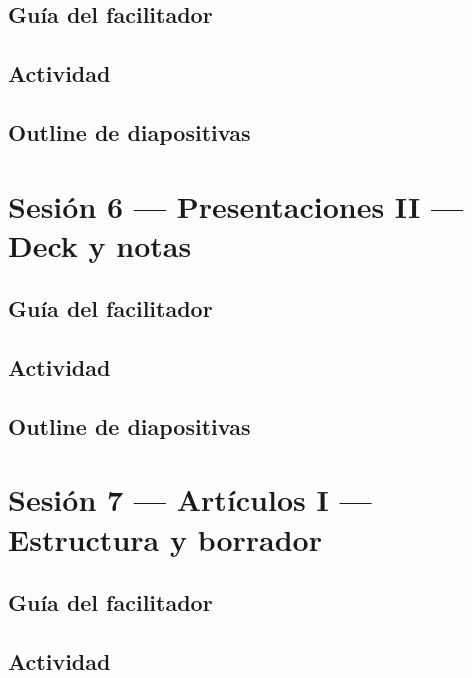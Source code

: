 \documentclass[11pt,a4paper]{report}
\begin{document}
\subsection*{Guía del facilitador}

\subsection*{Actividad}

\subsection*{Outline de diapositivas}


\section{Sesión 6 --- Presentaciones II --- Deck y notas}

\subsection*{Guía del facilitador}

\subsection*{Actividad}

\subsection*{Outline de diapositivas}


\section{Sesión 7 --- Artículos I --- Estructura y borrador}

\subsection*{Guía del facilitador}

\subsection*{Actividad}

\end{document}
